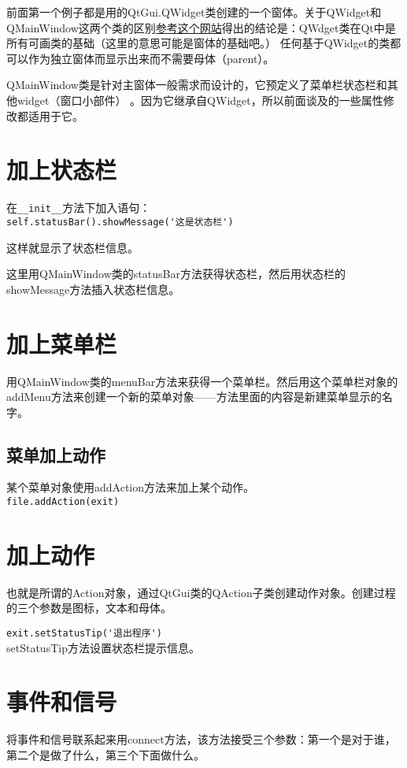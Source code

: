 \documentclass[12pt,oneside]{book}
\begin{document}
\begin{common-format}
前面第一个例子都是用的QtGui.QWidget类创建的一个窗体。关于QWidget和QMainWindow这两个类的区别\href{http://stackoverflow.com/questions/3298792/whats-the-difference-between-qmainwindow-and-qwidget-and-qdialog}{参考这个网站}得出的结论是：QWdget类在Qt中是所有可画类的基础（这里的意思可能是窗体的基础吧。） 任何基于QWidget的类都可以作为独立窗体而显示出来而不需要母体（parent）。

QMainWindow类是针对主窗体一般需求而设计的，它预定义了菜单栏状态栏和其他widget（窗口小部件） 。因为它继承自QWidget，所以前面谈及的一些属性修改都适用于它。

\section{加上状态栏}
在\verb+__init__+方法下加入语句：\\
\verb+self.statusBar().showMessage('这是状态栏')+

这样就显示了状态栏信息。

这里用QMainWindow类的statusBar方法获得状态栏，然后用状态栏的showMessage方法插入状态栏信息。


\section{加上菜单栏}
用QMainWindow类的menuBar方法来获得一个菜单栏。然后用这个菜单栏对象的addMenu方法来创建一个新的菜单对象——方法里面的内容是新建菜单显示的名字。

\subsection{菜单加上动作}
某个菜单对象使用addAction方法来加上某个动作。\\
\verb+file.addAction(exit)+


\section{加上动作}
也就是所谓的Action对象，通过QtGui类的QAction子类创建动作对象。创建过程的三个参数是图标，文本和母体。

\verb+exit.setStatusTip('退出程序')+\\
setStatusTip方法设置状态栏提示信息。


\section{事件和信号}
将事件和信号联系起来用connect方法，该方法接受三个参数：第一个是对于谁，第二个是做了什么，第三个下面做什么。


\end{common-format}
\end{document}
